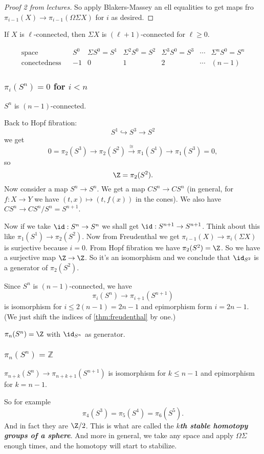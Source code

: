 \begin{remark}
\begin{proof}[Proof 2 from lectures]
	So apply Blakers-Massey an ell equalities to get maps fro $\pi_{i-1}(X)\to\pi_{i-1}(\Omega\Sigma X)$ for $i$ as desired.
\end{proof}
\begin{coro}
	If $X$ is $\ell$-connected, then $\Sigma X$ is $(\ell+1)$-connected for $\ell\geq0$.
\end{coro}
$$\begin{matrix}
	\text{space}&&S^0&\Sigma S^0=S^1&\Sigma^2S^0=S^2&\Sigma^3S^0=S^3&\cdots&\Sigma^nS^0=S^n\\
	\text{conectedness}&&-1&0&1&2&\cdots&(n-1)
\end{matrix}$$

\subsubsection{\texorpdfstring{$\pi_{i}(S^{n})=0$}{πᵢ(Sⁿ)} for \texorpdfstring{$i<n$}{i<n}}

\begin{coro}
	$S^n$ is $(n-1)$-connected.
\end{coro}
Back to Hopf fibration:
$$S^1\hookrightarrow S^3\to S^2$$
we get
$$0=\pi_2(S^3)\to\pi_2(S^2)\overset{\cong}{\to}\pi_1(S^1)\to\pi_1(S^3)=0,$$
so
$$\Z=\pi_2(S^2).$$
Now consider a map $S^n\to S^n$. We get a map $CS^n\to CS^n$ (in general, for $f:X\to Y$ we have $(t,x)\mapsto(t,f(x))$ in the cones). We also have $CS^n\to CS^n/S^n=S^{n+1}$.

Now if we take $\id:S^n\to S^n$ we shall get $\id:S^{n+1}\to S^{n+1}$. Think about this like $\pi_1(S^1)\to\pi_2(S^2)$. Now from Freudenthal we get $\pi_{i-1}(X)\to\pi_i(\Sigma X)$ is surjective because $i=0$. From Hopf fibration we have $\pi_2(S^2)=\Z$. So we have a surjective map $\Z\to\Z$. So it's an isomorphism and we conclude that $\id_{S^2}$ is a generator of $\pi_2(S^2)$.
\begin{coro}
	Since $S^n$ is $(n-1)$-connected, we have
	$$\pi_i(S^n)\to\pi_{i+1}(S^{n+1})$$
	is isomorphism for $i\leq 2(n-1)=2n-1$ and epimorphism form $i=2n-1$. (We just shift the indices of \cref{thm:freudenthal} by one.)
\end{coro}
\begin{coro}
	$\pi_n(S^n)=\Z$ with $\id_{S^n}$ as generator.
\end{coro}

\subsubsection{$\pi_{n}(S^{n})=\mathbb{Z}$}
\begin{coro}
	$\pi_{n+k}(S^n)\to\pi_{n+k+1}(S^{n+1})$ is isomorphism for $k\leq n-1$ and epimorphism for $k=n-1$.
\end{coro}
So for example
$$\pi_4(S^3)=\pi_5(S^4)=\pi_6(S^5).$$
And in fact they are $\Z/2$. This is what are called the \textbf{\textit{$k$th stable homotopy groups of a sphere}}. And more in general, we take any space and apply $\Omega\Sigma$ enough times, and the homotopy will start to stabilize.


\end{remark}

